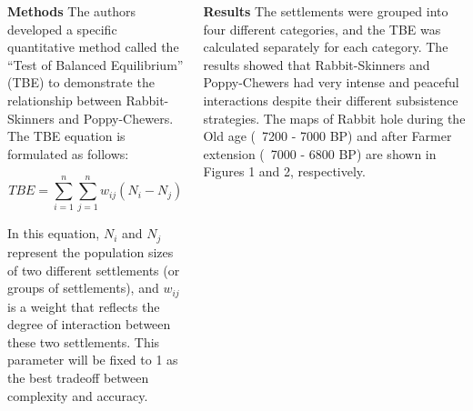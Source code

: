 \documentclass[final]{beamer}
\begin{document}
\begin{frame}[t]
\begin{columns}[t]
    \begin{block}{\textbf{Methods}}
            The authors developed a specific quantitative method called the ``Test of Balanced Equilibrium'' (TBE) to demonstrate the relationship between Rabbit-Skinners and Poppy-Chewers. The TBE equation is formulated as follows:

            \begin{equation}
                TBE = \sum_{i=1}^{n} \sum_{j=1}^{n} w_{ij} (N_i - N_j)
            \end{equation}

            In this equation, $N_i$ and $N_j$ represent the population sizes of two different settlements (or groups of settlements), and $w_{ij}$ is a weight that reflects the degree of interaction between these two settlements. This parameter will be fixed to 1 as the best tradeoff between complexity and accuracy.
        \end{block}

        \begin{block}{\textbf{Results}}
            The settlements were grouped into four different categories, and the TBE was calculated separately for each category. The results showed that Rabbit-Skinners and Poppy-Chewers had very intense and peaceful interactions despite their different subsistence strategies. The maps of Rabbit hole during the Old age (~7200 - 7000 BP) and after Farmer extension (~7000 - 6800 BP) are shown in Figures 1 and 2, respectively.


\end{block}
\end{columns}
\end{frame}
\end{document}
